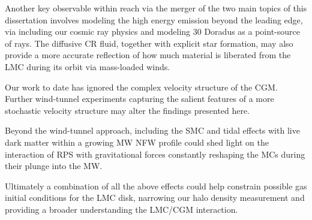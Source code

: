 Another key observable within reach via the merger of the two main topics of this dissertation involves modeling the high energy emission beyond the leading edge, via including our cosmic ray physics and modeling 30 Doradus as a point-source of rays. The diffusive CR fluid, together with explicit star formation, may also provide a more accurate reflection of how much material is liberated from the LMC during its orbit via mass-loaded winds.

Our work to date has ignored the complex velocity structure of the CGM. Further wind-tunnel experiments capturing the salient features of a more stochastic velocity structure may alter the findings presented here.

Beyond the wind-tunnel approach, including the SMC and tidal effects with live dark matter within a growing MW NFW profile could shed light on the interaction of RPS with gravitational forces constantly reshaping the MCs during their plunge into the MW.

Ultimately a combination of all the above effects could help constrain possible gas initial conditions for the LMC disk, narrowing our halo density measurement and providing a broader understanding the LMC/CGM interaction.























